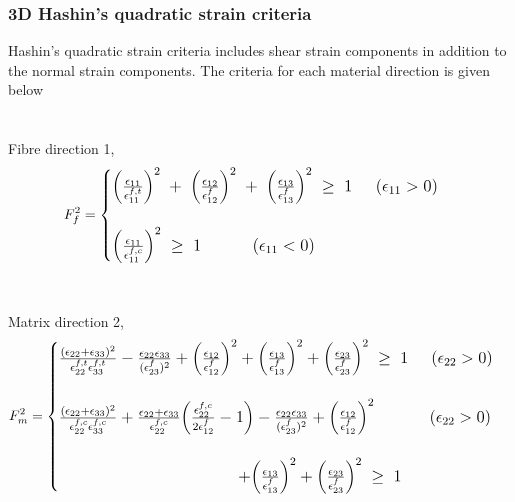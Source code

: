 \documentclass[a4paper,12pt]{article}
\begin{document}
\subsubsection{3D Hashin's quadratic strain criteria}
\indent\indent\indent Hashin's quadratic strain criteria includes shear strain components in addition to the normal strain components. The criteria for each material direction is given below\\
\\
\\
Fibre direction 1,
\\
\begin{equation}
\large{F_{f}^{2} =  
	\begin{cases}
	\Big(\frac{\epsilon_{11}}{\epsilon_{11}^{f,t}}\Big)^{2} \; + \; \Big(\frac{\epsilon_{12}}{\epsilon_{12}^{f}}\Big)^{2} \; + \; \Big(\frac{\epsilon_{13}}{\epsilon_{13}^{f}}\Big)^{2} \; \geq  \; 1  \; \; \; \; \;  (\epsilon_{11}  >  0)  \\
	\\
	\Big(\frac{\epsilon_{11}}{\epsilon_{11}^{f,c}}\Big)^{2}  \; \geq  \; 1 \; \; \; \; \; \; \;  \; \; \; \;  (\epsilon_{11}  <  0) 
	
	\end{cases}}
\end{equation}
\\
\\
Matrix direction 2,
\\
\begin{equation}
\large{F_{m}^{2} =  
	\begin{cases}
	
	\frac{(\epsilon_{22} + \epsilon_{33} )^{2}}{\epsilon_{22}^{f,t} \epsilon_{33}^{f,t}}   -  \frac{\epsilon_{22}\epsilon_{33}}{(\epsilon_{23}^{f})^{2}}  +  \Big(\frac{\epsilon_{12}}{\epsilon_{12}^{f}}\Big)^{2}  + \Big(\frac{\epsilon_{13}}{\epsilon_{13}^{f}}\Big)^{2}  +  \Big(\frac{\epsilon_{23}}{\epsilon_{23}^{f}}\Big)^{2} \;\geq  \; 1 \; \; \; \; \;  (\epsilon_{22}  >  0) \\
	\\
	
	\frac{(\epsilon_{22} + \epsilon_{33} )^{2}}{\epsilon_{22}^{f,c} \epsilon_{33}^{f,c}}  +  \frac{\epsilon_{22} + \epsilon_{33}}{\epsilon_{22}^{f,c}}\Big(\frac{\epsilon_{22}^{f,c}}{2\epsilon_{12}^{f}}  -  1\Big)   -  \frac{\epsilon_{22}\epsilon_{33}}{(\epsilon_{23}^{f})^{2}}  +  \Big(\frac{\epsilon_{12}}{\epsilon_{12}^{f}}\Big)^{2}\; \; \; \; \; \; \; \; \; \; \; \;  (\epsilon_{22}  >  0) \\ 
\\	
	\; \; \; \; \; \; \; \;\; \; \; \; \; \; \; \;\; \; \; \; \; \; \; \;  \; \;\; \; \; \; \; \; \; \;\; \; \; \; \;  + \Big(\frac{\epsilon_{13}}{\epsilon_{13}^{f}}\Big)^{2}   +  \Big(\frac{\epsilon_{23}}{\epsilon_{23}^{f}}\Big)^{2} \;\geq \; 1 
	
	
	\end{cases}}
\end{equation}
\end{document}
